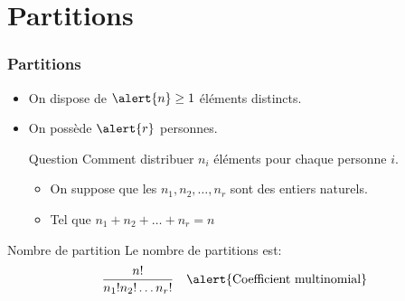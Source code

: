 \documentclass{beamer}
\begin{document}
\section{Partitions}
\begin{frame}[t]
  \frametitle{Partitions}
 \begin{itemize}
 \small
   \item<1-> On dispose de $\alert{n} \geq 1$ éléments distincts.
   \item<2->  On possède $\alert{r}$ personnes.
   \begin{block}{Question}
    Comment distribuer $n_i$ éléments pour chaque personne $i$. 
   \end{block}
   \begin{itemize}
     \item On suppose que les $n_1, n_2,\ldots, n_r$ sont des entiers naturels.
     \item Tel que $n_1 + n_2 + \ldots + n_r = n$
   \end{itemize}
   \pause
 \end{itemize} 

   \begin{block}{Nombre de partition}
     \small
     Le nombre de partitions est:
     \begin{equation}
     \dfrac{n!}{n_1!n_2!\ldots n_r!}\quad {\alert{\text{Coefficient multinomial}}}
     \end{equation}
   \end{block}
\end{frame}
\end{document}
